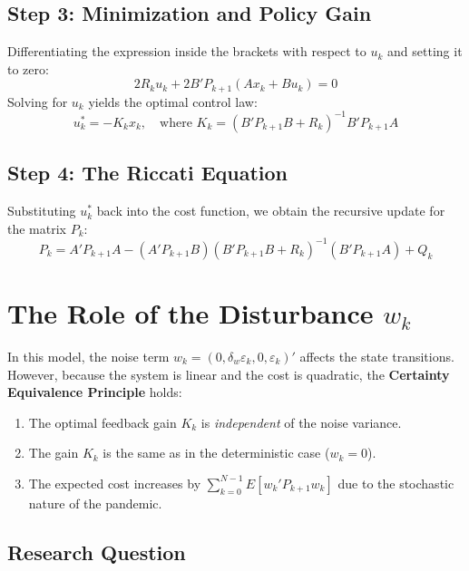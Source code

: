 \subsection{Step 3: Minimization and Policy Gain}
Differentiating the expression inside the brackets with respect to $u_k$ and setting it to zero:
\begin{equation}
2 R_k u_k + 2 B' P_{k+1} (Ax_k + Bu_k) = 0
\end{equation}
Solving for $u_k$ yields the optimal control law:
\begin{equation}
u_k^* = -K_k x_k, \quad \text{where } K_k = (B' P_{k+1} B + R_k)^{-1} B' P_{k+1} A
\end{equation}

\subsection{Step 4: The Riccati Equation}
Substituting $u_k^*$ back into the cost function, we obtain the recursive update for the matrix $P_k$:
\begin{equation}
P_k = A' P_{k+1} A - (A' P_{k+1} B) (B' P_{k+1} B + R_k)^{-1} (B' P_{k+1} A) + Q_k
\end{equation}

\section{The Role of the Disturbance $w_k$}
In this model, the noise term $w_k = (0, \delta_w \varepsilon_k, 0, \varepsilon_k)'$ affects the state transitions. However, because the system is linear and the cost is quadratic, the \textbf{Certainty Equivalence Principle} holds:
\begin{enumerate}
    \item The optimal feedback gain $K_k$ is \textit{independent} of the noise variance.
    \item The gain $K_k$ is the same as in the deterministic case ($w_k=0$).
    \item The expected cost increases by $\sum_{k=0}^{N-1} E[w_k' P_{k+1} w_k]$ due to the stochastic nature of the pandemic.
\end{enumerate}





\subsection{Research Question}

